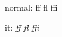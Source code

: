 \documentclass[letterpaper,12pt]{book}
\begin{document}
normal: ff fl ffi


it: \textit{ff fl ffi}

\showoutput
\end{document}
